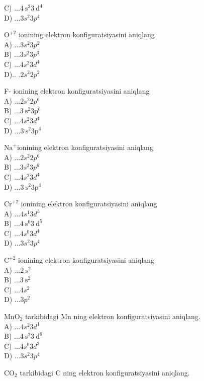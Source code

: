 C) $\ldots 4 \mathrm{~s}^{2} 3 \mathrm{~d}^{4}$\\
D) $\ldots 3 s^{2} 3 p^{4}$
  \item $\mathrm{O}^{+2}$ ionining elektron konfiguratsiyasini aniqlang\\
A) $\ldots 3 s^{2} 3 p^{2}$\\
B) $\ldots 3 s^{2} 3 p^{3}$\\
C) $\ldots 4 s^{2} 3 d^{4}$\\
D).. $.2 s^{2} 2 p^{2}$
  \item F- ionining elektron konfiguratsiyasini aniqlang\\
A) $\ldots 2 s^{2} 2 p^{6}$\\
B) $\ldots 3 \mathrm{~s}^{2} 3 \mathrm{p}^{6}$\\
C) $\ldots 4 s^{2} 3 d^{4}$\\
D) $\ldots 3 \mathrm{~s}^{2} 3 \mathrm{p}^{4}$
  \item $\mathrm{Na}^{+}$ionining elektron konfiguratsiyasini aniqlang\\
A) $\ldots 2 s^{2} 2 p^{6}$\\
B) $\ldots 3 s^{2} 3 p^{6}$\\
C) $\ldots 4 s^{2} 3 d^{4}$\\
D) $\ldots 3 \mathrm{~s}^{2} 3 \mathrm{p}^{4}$
  \item $\mathrm{Cr}^{+2}$ ionining elektron konfiguratsiyasini aniqlang\\
A) $\ldots 4 s^{1} 3 d^{3}$\\
B) $\ldots 4 \mathrm{~s}^{0} 3 \mathrm{~d}^{5}$\\
C) $\ldots 4 s^{0} 3 d^{4}$\\
D) $\ldots 3 s^{2} 3 p^{4}$
  \item $\mathrm{C}^{+2}$ ionining elektron konfiguratsiyasini aniqlang\\
A) $\ldots 2 \mathrm{~s}^{2}$\\
B) $\ldots 3 \mathrm{~s}^{2}$\\
C) $\ldots 4 s^{2}$\\
D) $\ldots 3 p^{2}$
  \item $\mathrm{MnO}_{2}$ tarkibidagi Mn ning elektron konfiguratsiyasini aniqlang.\\
A) $\ldots 4 s^{2} 3 d^{1}$\\
B) $\ldots 4 \mathrm{~s}^{2} 3 \mathrm{~d}^{6}$\\
C) $\ldots 4 s^{0} 3 d^{3}$\\
D) $\ldots 3 s^{2} 3 p^{4}$\\
  \item $\mathrm{CO}_{2}$ tarkibidagi C ning elektron konfiguratsiyasini aniqlang.\\
